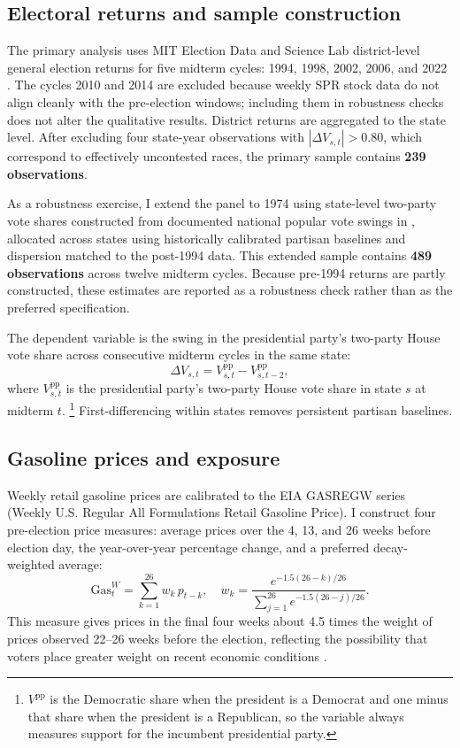 \documentclass[12pt]{article}
\begin{document}
\subsection{Electoral returns and sample construction}

The primary analysis uses MIT Election Data and Science Lab district-level general election returns for five midterm cycles: 1994, 1998, 2002, 2006, and 2022 \citep{MEDSL2023}. The cycles 2010 and 2014 are excluded because weekly SPR stock data do not align cleanly with the pre-election windows; including them in robustness checks does not alter the qualitative results. District returns are aggregated to the state level. After excluding four state-year observations with $|\Delta V_{s,t}|>0.80$, which correspond to effectively uncontested races, the primary sample contains \textbf{239 observations}.

As a robustness exercise, I extend the panel to 1974 using state-level two-party vote shares constructed from documented national popular vote swings in \citet{CQ_almanac}, allocated across states using historically calibrated partisan baselines and dispersion matched to the post-1994 data. This extended sample contains \textbf{489 observations} across twelve midterm cycles. Because pre-1994 returns are partly constructed, these estimates are reported as a robustness check rather than as the preferred specification.

The dependent variable is the swing in the presidential party's two-party House vote share across consecutive midterm cycles in the same state:
\begin{equation}
  \Delta V_{s,t} = V^{\mathrm{pp}}_{s,t} - V^{\mathrm{pp}}_{s,t-2},
  \label{eq:swing}
\end{equation}
where $V^{\mathrm{pp}}_{s,t}$ is the presidential party's two-party House vote share in state $s$ at midterm $t$.
\footnote{$V^{\mathrm{pp}}$ is the Democratic share when the president is a Democrat and one minus that share when the president is a Republican, so the variable always measures support for the incumbent presidential party.}
First-differencing within states removes persistent partisan baselines.

\subsection{Gasoline prices and exposure}

Weekly retail gasoline prices are calibrated to the EIA GASREGW series (Weekly U.S. Regular All Formulations Retail Gasoline Price). I construct four pre-election price measures: average prices over the 4, 13, and 26 weeks before election day, the year-over-year percentage change, and a preferred decay-weighted average:
\begin{equation}
  \mathrm{Gas}^{W}_{t} = \sum_{k=1}^{26} w_k\, p_{t-k},
  \quad w_k = \frac{e^{-1.5(26-k)/26}}{\displaystyle\sum_{j=1}^{26}
  e^{-1.5(26-j)/26}}.
  \label{eq:gasW}
\end{equation}
This measure gives prices in the final four weeks about 4.5 times the weight of prices observed 22--26 weeks before the election, reflecting the possibility that voters place greater weight on recent economic conditions \citep{Healy2010, Fiorina1981}.
\end{document}
